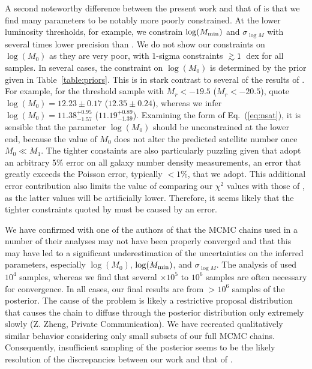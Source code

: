 \documentclass[usenatbib,usegraphicx,letterpaper]{mn2e}
\newcommand{\gsim}{\lower0.6ex\vbox{\hbox{$ \buildrel{\textstyle >}\over{\sim}\ $}}}
\def\gtsima{$\; \buildrel > \over \sim \;$}
\def\gsim{\lower.7ex\hbox{\gtsima}}
\def\ga{\gsim}
\def\gta{\ga}
\begin{document}
A second noteworthy difference between the present work and that of
\citet{zehavi_etal11} is that we find many parameters to be notably
more poorly constrained. At the lower luminosity thresholds, for
example, we constrain $\log (M_{\rm min})$ and $\sigma_{\log M}$ with
several times lower precision than \citet{zehavi_etal11}. We do not
show our constraints on $\log (M_0)$ as they are very poor, with
1-sigma constraints $\gta 1$~dex for all samples. In several cases,
the constraint on $\log (M_0)$ is determined by the prior given in
Table~\ref{table:priors}. This is in stark contrast to several of the
results of \citet{zehavi_etal11}. For example, for the threshold
sample with $M_r < -19.5$ ($M_r < -20.5$), \citet{zehavi_etal11} quote
$\log (M_0) = 12.23 \pm 0.17$ ($12.35 \pm 0.24$), whereas we infer
$\log (M_0) = 11.38^{+0.95}_{-1.57}$
($11.19^{+0.89}_{-1.39}$). Examining the form of Eq.~(\ref{eq:nsat}),
it is sensible that the parameter $\log (M_0)$ should be unconstrained
at the lower end, because the value of $M_0$ does not alter the
predicted satellite number once $M_0 \ll M_1$. The tighter constaints are also 
particularly puzzling given that \citet{zehavi_etal11} adopt an arbitrary 5\% error on 
all galaxy number density measurements, an error that greatly exceeds the 
Poisson error, typically $< 1\%$, that we adopt. This additional error 
contribution also limits the value of comparing our $\chi^2$ values with those of 
\citet{zehavi_etal11}, as the latter values will be artificially lower. 
Therefore, it seems likely that the tighter constraints quoted by \citet{zehavi_etal11}
must be caused by an error.


We have confirmed with one of the authors of \citet{zehavi_etal11}
that the MCMC chains used in a number of their analyses may not have been
properly converged and that this may have led to a significant underestimation of the
uncertainties on the inferred parameters, especially $\log (M_0)$, $\log (M_{\rm min})$,
and $\sigma_{\log M}$. The analysis of \citet{zehavi_etal11}
used $10^4$ samples, whereas we find that several $\times 10^5$ to $10^6$ 
samples are often necessary for convergence. In all cases, our final results are from 
$>10^6$ samples of the posterior. The cause of the problem is likely a 
restrictive proposal distribution that causes the chain to
diffuse through the posterior distribution only extremely slowly (Z. Zheng, Private Communication). 
We have recreated qualitatively similar behavior considering only small subsets of our full 
MCMC chains. Consequently, insufficient sampling of the posterior seems to be the likely resolution
of the discrepancies between our work and that of \citet{zehavi_etal11}.
\end{document}
